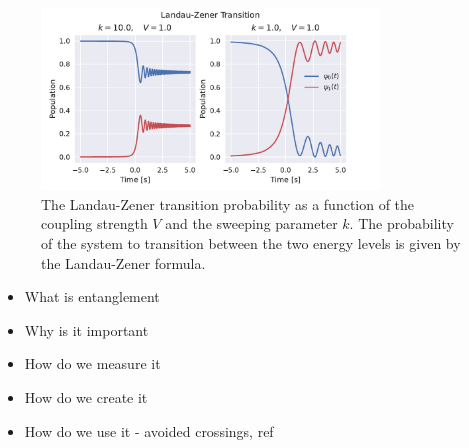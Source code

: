 \documentclass{subfiles}
\begin{document}
\begin{figure}[h!]
    \centering
    \includegraphics[width=0.8\textwidth]{figs/landau_zener.pdf}
    \caption{The Landau-Zener transition probability as a function of the coupling strength $V$ and the sweeping parameter $k$. The probability of the system to transition between the two energy levels is given by the Landau-Zener formula.}
    \label{fig:landau_zener}
\end{figure} 



\begin{itemize}
    \item What is entanglement
    \item Why is it important
    \item How do we measure it
    \item How do we create it
    \item How do we use it - avoided crossings, ref \cite{nazir2005anticrossings}
\end{itemize}
\end{document}
